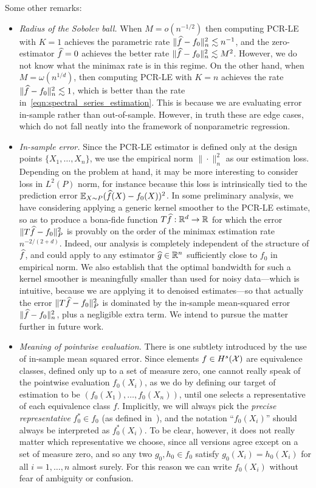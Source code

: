 Some other remarks:
\begin{itemize}
	\item \emph{Radius of the Sobolev ball.} 
	When $M = o(n^{-1/2})$ then computing PCR-LE with $K = 1$ achieves the parametric rate $\|\widehat{f} - f_0\|_n^2 \lesssim n^{-1}$, and the zero-estimator $\widehat{f} = 0$ achieves the better rate $\|\widehat{f} - f_0\|_n^2 \lesssim M^2$. However, we do not know what the minimax rate is in this regime. On the other hand, when $M = \omega(n^{1/d})$, then computing PCR-LE with $K = n$ achieves the rate $\|\widehat{f} - f_0\|_n^2 \lesssim 1$, which is better than the rate in~\eqref{eqn:spectral_series_estimation}. This is because we are evaluating error in-sample rather than out-of-sample. However, in truth these are edge cases, which do not fall neatly into the framework of nonparametric regression. 
	
	\item \emph{In-sample error.} Since the PCR-LE estimator is defined only at the design points $\{X_1,\ldots,X_n\}$, we use the empirical norm $\|\cdot\|_n^2$ as our estimation loss. Depending on the problem at hand, it may be more interesting to consider loss in $L^2(P)$ norm, for instance because this loss is intrinsically tied to the prediction error $\mathbb{E}_{X \sim P}(\widehat{f}(X) - f_0(X))^2$. In some preliminary analysis, we have considering applying a generic kernel smoother to the PCR-LE estimate, so as to produce a bona-fide function $T\widehat{f}: \mathbb{R}^d \to \mathbb{R}$ for which the error $\|T\widehat{f} - f_0\|_P^2$ is provably on the order of the minimax estimation rate $n^{-2/(2 + d)}$. Indeed, our analysis is completely independent of the structure of $\widehat{f}$, and could apply to any estimator $\widehat{g} \in \mathbb{R}^n$ sufficiently close to $f_0$ in empirical norm. We also establish that the optimal bandwidth for such a kernel smoother is meaningfully smaller than used for noisy data---which is intuitive, because we are applying it to denoised estimates---so that actually the error  $\|T\widehat{f} - f_0\|_P^2$ is dominated by the in-sample mean-squared error $\|\widehat{f} - f_0\|_n^2$, plus a negligible extra term. We intend to pursue the matter further in future work.
	
	\item \emph{Meaning of pointwise evaluation.} There is one subtlety introduced by the use of in-sample mean squared error. Since elements $f \in H^s(\mathcal{X})$ are equivalence classes, defined only up to a set of measure zero, one cannot really speak of the pointwise evaluation $f_0(X_i)$, as we do by defining our target of estimation to be $(f_0(X_1),\ldots,f_0(X_n))$, until one selects a representative of each equivalence class $f$. Implicitly, we will always pick the \emph{precise representative} $f_0^{\ast} \in f_0$ (as defined in~\cite{evans15}), and the notation ``$f_0(X_i)$'' should always be interpreted as $f_0^{\ast}(X_i)$. To be clear, however, it does not really matter which representative we choose, since all versions agree except on a set of measure zero, and so any two $g_0,h_0 \in f_0$ satisfy $g_0(X_i) = h_0(X_i)$ for all $i = 1,\ldots,n$ almost surely. For this reason we can write $f_0(X_i)$ without fear of ambiguity or confusion. 
	

\end{itemize}
